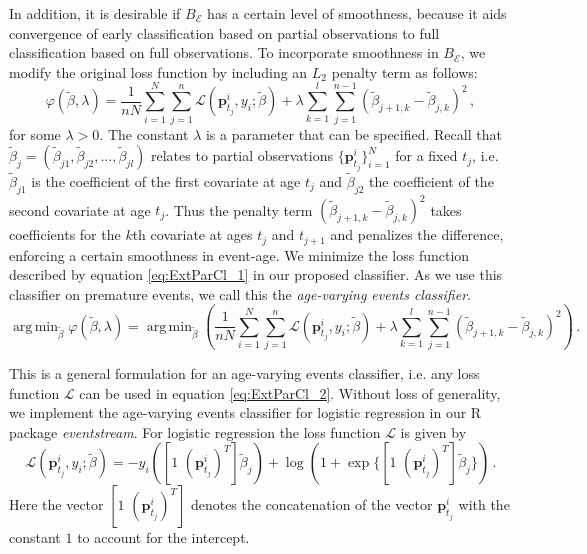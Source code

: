 \documentclass[a4paper,11pt]{article}
\DeclareMathOperator*{\argmin}{arg\,min}
\begin{document}
In addition, it is desirable if $B_{\mathscr{E}}$ has a certain level of smoothness, because it aids convergence of early classification based on partial observations to  full classification based on full observations. To incorporate smoothness in $B_{\mathscr{E}}$, we modify the original loss function by including an $L_2$ penalty term as follows:
\begin{equation}\label{eq:ExtParCl_1}
	\varphi\left(\tilde{\beta}, \lambda \right) = \frac{1}{nN} \sum_{i=1}^N \sum_{j=1}^n \mathscr{L} \left( \bm{p}^i_{t_j},y_i;\tilde{\beta} \right) + \lambda \sum_{k=1}^l\sum_{j=1}^{n-1} \left(\tilde{\beta}_{j+1,k} - \tilde{\beta}_{j,k} \right)^2 \, ,
\end{equation}
for some $\lambda >0 $. The constant $\lambda$ is a parameter that can be specified. Recall that $\tilde{\beta}_j = \left( \tilde{\beta}_{j1}, \tilde{\beta}_{j2}, \dots, \tilde{\beta}_{jl} \right)$ relates to partial observations $\{ \bm{p}^i_{t_j}\}_{i=1}^N$ for a fixed $t_j$, i.e. $\tilde{\beta}_{j1}$ is the coefficient of the first covariate at age $t_j$ and $\tilde{\beta}_{j2}$ the coefficient of the second covariate at age $t_j$. Thus the penalty term $(\tilde{\beta}_{j+1,k} - \tilde{\beta}_{j,k})^2$ takes coefficients for the $k$th covariate at ages $t_j$ and $t_{j+1}$ and penalizes the difference, enforcing a certain smoothness in event-age. We minimize the loss function described by equation \eqref{eq:ExtParCl_1} in our proposed classifier. As we use this classifier on premature events, we call this the \textit{age-varying events classifier}.
\begin{equation}\label{eq:ExtParCl_2}
	\argmin_{\tilde{\beta}} \varphi\left(\tilde{\beta}, \lambda \right) = 	\argmin_{\tilde{\beta}} \left( \frac{1}{nN} \sum_{i=1}^N \sum_{j=1}^n \mathscr{L} ( \bm{p}^i_{t_j},y_i;\tilde{\beta} ) + \lambda \sum_{k=1}^l\sum_{j=1}^{n-1} (\tilde{\beta}_{j+1,k} - \tilde{\beta}_{j,k} )^2 \right) \, .
\end{equation}

This is a general formulation for an age-varying events classifier, i.e. any loss function $\mathscr{L}$ can be used in equation \eqref{eq:ExtParCl_2}. Without loss of generality, we implement the age-varying events classifier for logistic regression in our R package \textit{eventstream}. For logistic regression \cite{friedman2001elements} the loss function $\mathscr{L}$ is given by
\begin{equation}\label{eq:LogReg}
	\mathscr{L} (\bm{p}^i_{t_j},y_i;\tilde{\beta}) = - y_i \left( [ 1 \,\, ( \bm{p}^i_{t_j})^T] \tilde{\beta}_{j} \right) + \log \left( 1+ \exp\big\{[ 1 \, \,( \bm{p}^i_{t_j})^T ] \tilde{\beta}_{j}\big\} \right) \, .
\end{equation}
Here the vector $[1 \,\, ( \bm{p}^i_{t_j})^T]$ denotes the concatenation of the vector $\bm{p}^i_{t_j}$ with the constant $1$ to account for the intercept. %
\end{document}
